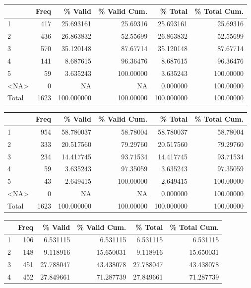 \documentclass[
  letterpaper,
  DIV=11,
  numbers=noendperiod]{scrartcl}
\begin{document}
\begin{table}

\centering
\begin{tabular}[t]{l|r|r|r|r|r}
\hline
  & Freq & \% Valid & \% Valid Cum. & \% Total & \% Total Cum.\\
\hline
1 & 417 & 25.693161 & 25.69316 & 25.693161 & 25.69316\\
\hline
2 & 436 & 26.863832 & 52.55699 & 26.863832 & 52.55699\\
\hline
3 & 570 & 35.120148 & 87.67714 & 35.120148 & 87.67714\\
\hline
4 & 141 & 8.687615 & 96.36476 & 8.687615 & 96.36476\\
\hline
5 & 59 & 3.635243 & 100.00000 & 3.635243 & 100.00000\\
\hline
<NA> & 0 & NA & NA & 0.000000 & 100.00000\\
\hline
Total & 1623 & 100.000000 & 100.00000 & 100.000000 & 100.00000\\
\hline
\end{tabular}
\centering
\begin{tabular}[t]{l|r|r|r|r|r}
\hline
  & Freq & \% Valid & \% Valid Cum. & \% Total & \% Total Cum.\\
\hline
1 & 954 & 58.780037 & 58.78004 & 58.780037 & 58.78004\\
\hline
2 & 333 & 20.517560 & 79.29760 & 20.517560 & 79.29760\\
\hline
3 & 234 & 14.417745 & 93.71534 & 14.417745 & 93.71534\\
\hline
4 & 59 & 3.635243 & 97.35059 & 3.635243 & 97.35059\\
\hline
5 & 43 & 2.649415 & 100.00000 & 2.649415 & 100.00000\\
\hline
<NA> & 0 & NA & NA & 0.000000 & 100.00000\\
\hline
Total & 1623 & 100.000000 & 100.00000 & 100.000000 & 100.00000\\
\hline
\end{tabular}
\centering
\begin{tabular}[t]{l|r|r|r|r|r}
\hline
  & Freq & \% Valid & \% Valid Cum. & \% Total & \% Total Cum.\\
\hline
1 & 106 & 6.531115 & 6.531115 & 6.531115 & 6.531115\\
\hline
2 & 148 & 9.118916 & 15.650031 & 9.118916 & 15.650031\\
\hline
3 & 451 & 27.788047 & 43.438078 & 27.788047 & 43.438078\\
\hline
4 & 452 & 27.849661 & 71.287739 & 27.849661 & 71.287739\\

\end{tabular}
\end{table}
\end{document}

